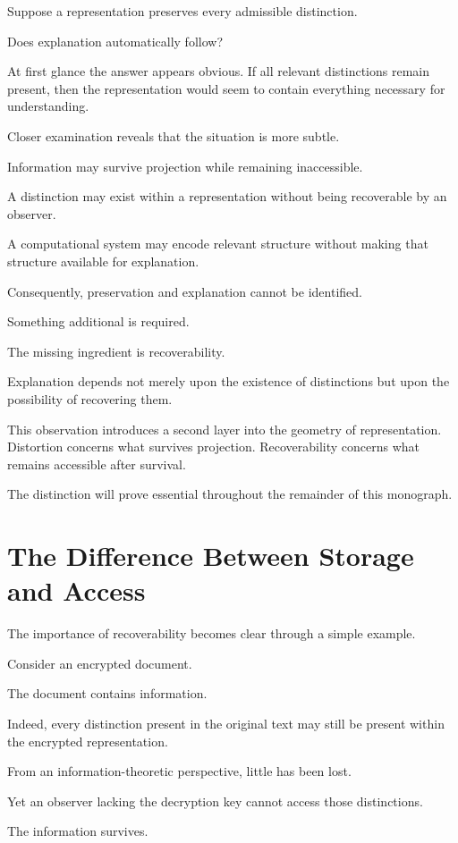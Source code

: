 \documentclass[11pt,oneside,openany]{book}
\begin{document}
Suppose a representation preserves every admissible distinction.

Does explanation automatically follow?

At first glance the answer appears obvious. If all relevant distinctions remain present, then the representation would seem to contain everything necessary for understanding.

Closer examination reveals that the situation is more subtle.

Information may survive projection while remaining inaccessible.

A distinction may exist within a representation without being recoverable by an observer.

A computational system may encode relevant structure without making that structure available for explanation.

Consequently, preservation and explanation cannot be identified.

Something additional is required.

The missing ingredient is recoverability.

Explanation depends not merely upon the existence of distinctions but upon the possibility of recovering them.

This observation introduces a second layer into the geometry of representation. Distortion concerns what survives projection. Recoverability concerns what remains accessible after survival.

The distinction will prove essential throughout the remainder of this monograph.

\section{The Difference Between Storage and Access}

The importance of recoverability becomes clear through a simple example.

Consider an encrypted document.

The document contains information.

Indeed, every distinction present in the original text may still be present within the encrypted representation.

From an information-theoretic perspective, little has been lost.

Yet an observer lacking the decryption key cannot access those distinctions.

The information survives.
\end{document}
